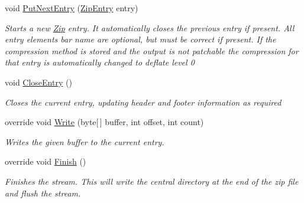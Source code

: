 \begin{DoxyCompactItemize}
void \hyperlink{class_i_c_sharp_code_1_1_sharp_zip_lib_1_1_zip_1_1_zip_output_stream_a1eb2730350237fd6e7e41a06e3ede119}{Put\+Next\+Entry} (\hyperlink{class_i_c_sharp_code_1_1_sharp_zip_lib_1_1_zip_1_1_zip_entry}{Zip\+Entry} entry)
\begin{DoxyCompactList}\small\item\em Starts a new \hyperlink{namespace_i_c_sharp_code_1_1_sharp_zip_lib_1_1_zip}{Zip} entry. It automatically closes the previous entry if present. All entry elements bar name are optional, but must be correct if present. If the compression method is stored and the output is not patchable the compression for that entry is automatically changed to deflate level 0 \end{DoxyCompactList}\item 
void \hyperlink{class_i_c_sharp_code_1_1_sharp_zip_lib_1_1_zip_1_1_zip_output_stream_afbc26f3bc0a0ae858e60f168714960ff}{Close\+Entry} ()
\begin{DoxyCompactList}\small\item\em Closes the current entry, updating header and footer information as required \end{DoxyCompactList}\item 
override void \hyperlink{class_i_c_sharp_code_1_1_sharp_zip_lib_1_1_zip_1_1_zip_output_stream_a7534b9ce4f3ad0aa390b0dd4b8314c88}{Write} (byte\mbox{[}$\,$\mbox{]} buffer, int offset, int count)
\begin{DoxyCompactList}\small\item\em Writes the given buffer to the current entry. \end{DoxyCompactList}\item 
override void \hyperlink{class_i_c_sharp_code_1_1_sharp_zip_lib_1_1_zip_1_1_zip_output_stream_a4d08a1654b19d3ed90377c11c3459c94}{Finish} ()
\begin{DoxyCompactList}\small\item\em Finishes the stream. This will write the central directory at the end of the zip file and flush the stream. \end{DoxyCompactList}\end{DoxyCompactItemize}
